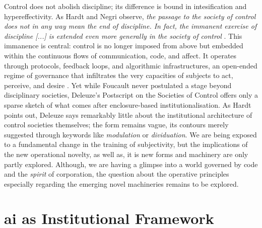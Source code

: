
Control does not abolish discipline; its difference is bound in intesification and hypereffectivity. As Hardt and Negri \parencite*{hardt2003}  observe, \textit{the passage to the society of control does not in any way mean the end of discipline. In fact, the immanent exercise of discipline [...] is extended even more generally in the society of control} \parencite[83]{galloway2001}. This immanence is central: control is no longer imposed from above but embedded within the continuous flows of communication, code, and affect. It operates through protocols, feedback loops, and algorithmic infrastructures, an open-ended regime of governance that infiltrates the very capacities of subjects to act, perceive, and desire
. Yet while Foucault never postulated a stage beyond disciplinary societies, Deleuze’s Postscript on the Societies of Control offers only a sparse sketch of what comes after enclosure-based institutionalisation. As Hardt \parencite*[139]{hardt1998}  points out, Deleuze says remarkably little about the institutional architecture of control societies themselves; the form remains vague, its contours merely suggested through keywords like \textit{modulation} or \textit{dividuation}. We are being exposed to a fundamental change in the training of subjectivity, but the implications of the new operational novelty, as well as, it is new forms and machinery are only partly explored. Although, we are having a glimpse into a world governed by code and the \textit{spirit} of corporation, the question about the operative principles especially regarding the emerging novel machineries remains to be explored.




\section{\Gls{ai} as Institutional Framework}


